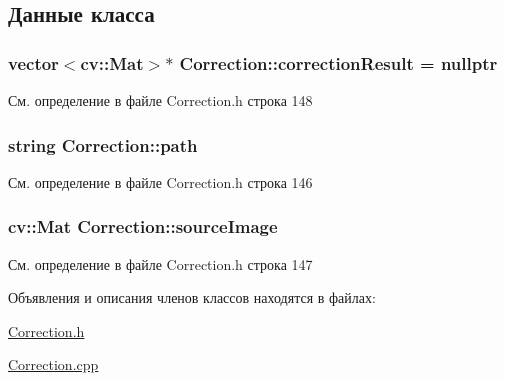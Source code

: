 \subsection{Данные класса}
\hypertarget{class_correction_a02fff781df4df45a3bb6f0a2484cafcc}{
\subsubsection[{correction\+Result}]{\setlength{\rightskip}{0pt plus 5cm}vector$<$cv\+::\+Mat$>$$\ast$ Correction\+::correction\+Result = nullptr\hspace{0.3cm}{\ttfamily [private]}}}\label{class_correction_a02fff781df4df45a3bb6f0a2484cafcc}


См. определение в файле Correction.\+h строка 148

\hypertarget{class_correction_a6e1ccea5c33ea89d717d9227d17f625c}{
\subsubsection[{path}]{\setlength{\rightskip}{0pt plus 5cm}string Correction\+::path\hspace{0.3cm}{\ttfamily [private]}}}\label{class_correction_a6e1ccea5c33ea89d717d9227d17f625c}


См. определение в файле Correction.\+h строка 146

\hypertarget{class_correction_a1344ad4fb7d6a6346c2524e06feddd4b}{
\subsubsection[{source\+Image}]{\setlength{\rightskip}{0pt plus 5cm}cv\+::\+Mat Correction\+::source\+Image\hspace{0.3cm}{\ttfamily [private]}}}\label{class_correction_a1344ad4fb7d6a6346c2524e06feddd4b}


См. определение в файле Correction.\+h строка 147



Объявления и описания членов классов находятся в файлах\+:\begin{DoxyCompactItemize}
\item 
\hyperlink{_correction_8h}{Correction.\+h}\item 
\hyperlink{_correction_8cpp}{Correction.\+cpp}\end{DoxyCompactItemize}
